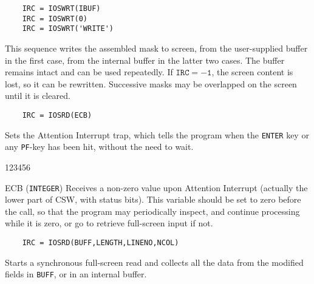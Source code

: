 \begin{verbatim}
    IRC = IOSWRT(IBUF)
    IRC = IOSWRT(0)
    IRC = IOSWRT('WRITE')
\end{verbatim}
This sequence writes the assembled mask to screen, from the user-supplied
buffer in the first case, from the internal buffer in the latter two
cases. The buffer remains intact and can be used repeatedly.
If $\mathtt{IRC = -1}$, the screen content is lost, so it can be rewritten.
Successive masks may be overlapped on the screen until it is cleared.
\newpage
\begin{verbatim}
    IRC = IOSRD(ECB)
\end{verbatim}
Sets the Attention Interrupt trap, which tells the program when the
{\tt ENTER} key or any {\tt PF}-key has been hit, without the need to
wait.
\begin{DLtt}{123456}
\item [ECB] ({\tt INTEGER}) Receives a non-zero value upon Attention
Interrupt (actually the lower part of CSW, with status bits).
This variable should be set to zero before the call, so that the program
may periodically inspect, and continue processing while it is zero,
or go to retrieve full-screen input if not.
\end{DLtt}
\begin{verbatim}
    IRC = IOSRD(BUFF,LENGTH,LINENO,NCOL)
\end{verbatim}
Starts a synchronous full-screen read and collects all the data from the
modified fields in {\tt BUFF}, or in an internal buffer.
